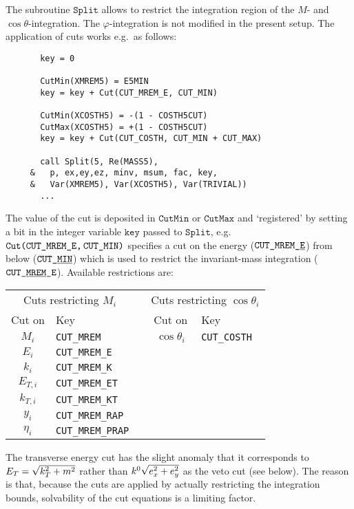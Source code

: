 \documentclass[twoside,11pt]{article}
\def\Code#1{\ensuremath{\texttt{#1}}}
\def\eg{e.g.\ }
\def\uscore{\symbol{95}}
\begin{document}
The subroutine \Code{Split} allows to restrict the integration region of 
the $M$- and $\cos\theta$-integration.  The $\varphi$-integration is not 
modified in the present setup.  The application of cuts works \eg as 
follows:
\begin{verbatim}
       key = 0

       CutMin(XMREM5) = E5MIN
       key = key + Cut(CUT_MREM_E, CUT_MIN)

       CutMin(XCOSTH5) = -(1 - COSTH5CUT)
       CutMax(XCOSTH5) = +(1 - COSTH5CUT)
       key = key + Cut(CUT_COSTH, CUT_MIN + CUT_MAX)

       call Split(5, Re(MASS5),
     &   p, ex,ey,ez, minv, msum, fac, key,
     &   Var(XMREM5), Var(XCOSTH5), Var(TRIVIAL))
       ...
\end{verbatim}
The value of the cut is deposited in \Code{CutMin} or \Code{CutMax} and 
`registered' by setting a bit in the integer variable \Code{key} passed 
to \Code{Split}, \eg \Code{Cut(CUT\uscore MREM\uscore E,\,CUT\uscore MIN)}
specifies a cut on the energy (\Code{CUT\uscore MREM\uscore\underline{E}})
from below (\Code{CUT\uscore\underline{MIN}}) which is used to restrict 
the invariant-mass integration (\Code{CUT\uscore\underline{MREM}\uscore E}).
Available restrictions are:
\begin{center}
\begin{tabular}{|c|l|l|c|l|}
\multicolumn{2}{c}{Cuts restricting $M_i$} &
\multicolumn{1}{c}{\qquad} &
\multicolumn{2}{c}{Cuts restricting $\cos\theta_i$} \\
\cline{1-2}\cline{4-5}
Cut on & Key & & Cut on & Key \\
\cline{1-2}\cline{4-5}
$M_i$     & \verb=CUT_MREM=      & & $\cos\theta_i$     & \verb=CUT_COSTH= \\
$E_i$     & \verb=CUT_MREM_E=    & &			& \\
$k_i$     & \verb=CUT_MREM_K=    & &			& \\
$E_{T,i}$ & \verb=CUT_MREM_ET=   & &			& \\
$k_{T,i}$ & \verb=CUT_MREM_KT=   & &			& \\
$y_i$     & \verb=CUT_MREM_RAP=  & &			& \\
$\eta_i$  & \verb=CUT_MREM_PRAP= & &			& \\
\cline{1-2}\cline{4-5}
\end{tabular}
\end{center}
The transverse energy cut has the slight anomaly that it corresponds to 
$E_T = \sqrt{\smash[b]{k_T^2} + m^2}$ rather than $k^0 
\sqrt{\smash[b]{e_x^2 + e_y^2}}$ as the veto cut (see below).  The 
reason is that, because the cuts are applied by actually restricting the 
integration bounds, solvability of the cut equations is a limiting 
factor.
\end{document}
